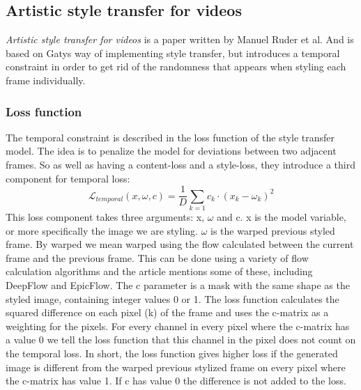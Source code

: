 \subsection{Artistic style transfer for videos}
\label{seq:ruder}
\textit{Artistic style transfer for videos} is a paper written by Manuel Ruder et al. \cite{Ruder:1} And is based on Gatys \cite{Gatys:1} way of implementing style transfer, but introduces a temporal constraint in order to get rid of the randomness that appears when styling each frame individually. \nextline
\subsubsection{Loss function}
The temporal constraint is described in the loss function of the style transfer model. The idea is to penalize the model for deviations between two adjacent frames. So as well as having a content-loss and a style-loss, they introduce a third component for temporal loss: 
\begin{equation}
\mathcal{L}_{temporal}(x, \omega, c) = \frac{1}{D}\sum_{k=1} c_k \cdot (x_k - \omega_k)^2
\end{equation}
\nextline This loss component takes three arguments: x, $\omega$ and c. x is the model variable, or more specifically the image we are styling. $\omega$ is the warped previous styled frame. By warped we mean warped using the flow calculated between the current frame and the previous frame. This can be done using a variety of flow calculation algorithms and the article mentions some of these, including DeepFlow and EpicFlow. The c parameter is a mask with the same shape as the styled image, containing integer values 0 or 1. The loss function calculates the squared difference on each pixel (k) of the frame and uses the c-matrix as a weighting for the pixels. For every channel in every pixel where the c-matrix has a value 0 we tell the loss function that this channel in the pixel does not count on the temporal loss. In short, the loss function gives higher loss if the generated image is different from the warped previous stylized frame on every pixel where the c-matrix has value 1. If c has value 0 the difference is not added to the loss. 

